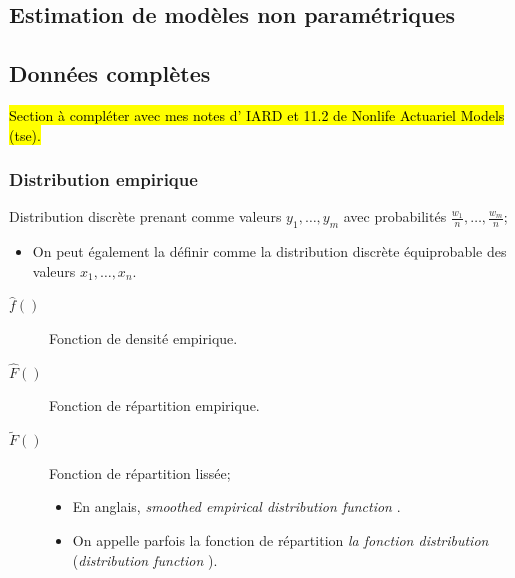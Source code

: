 \documentclass[10pt, french]{article}
\begin{document}
\begin{multicols*}{2}
\pagebreak
\section{Estimation de modèles non paramétriques}
\subsection{Données complètes}
\hl{Section à compléter avec mes notes d’ IARD et 11.2 de Nonlife Actuariel Models (tse).}
\subsubsection{Distribution empirique}
\begin{definitionNOHFILL}
Distribution discrète prenant comme valeurs $y_{1}, \dots, y_{m}$ avec probabilités $\frac{w_{1}}{n}, \dots, \frac{w_{m}}{n}$;
\begin{itemize}
	\item	On peut également la définir comme la distribution discrète équiprobable des valeurs $x_{1}, \dots, x_{n}$.
\end{itemize}
\end{definitionNOHFILL}

\begin{distributions}[Notation]
\begin{description}
	\item[$\hat{f}()$]	Fonction de densité empirique.	
	\item[$\hat{F}()$]	Fonction de répartition empirique.	
	\item[$\tilde{F}()$]	Fonction de répartition lissée;
		\begin{itemize}
		\item	En anglais, \og \textit{smoothed empirical distribution function} \fg{}.
		\item	On appelle parfois la fonction de répartition \textit{la fonction distribution} (\og \textit{distribution function} \fg{}).
		\end{itemize}
\end{description}
\end{distributions}


\end{multicols*}
\end{document}

